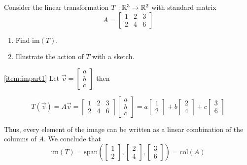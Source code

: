 \documentclass{ximera}
\begin{document}
\begin{example}\label{ex:image1}
Consider the linear transformation $T:\mathbb{R}^3\rightarrow \mathbb{R}^2$ with standard matrix
$$A=\begin{bmatrix}1&2&3\\2&4&6\end{bmatrix}$$

\begin{enumerate}
\item\label{item:impart1}
Find $\mbox{im}(T)$.
\item\label{item:impart2}
Illustrate the action of $T$ with a sketch.

\end{enumerate}
\begin{explanation}

\ref{item:impart1} Let $\vec{v}=\begin{bmatrix}a\\b\\c\end{bmatrix}$ then

$$T(\vec{v})=A\vec{v}=\begin{bmatrix}1&2&3\\2&4&6\end{bmatrix}\begin{bmatrix}a\\b\\c\end{bmatrix}=a\begin{bmatrix}1\\2\end{bmatrix}+b\begin{bmatrix}2\\4\end{bmatrix}+c\begin{bmatrix}3\\6\end{bmatrix}$$

Thus, every element of the image can be written as a linear combination of the columns of $A$.  We conclude that 
$$\mbox{im}(T)=\mbox{span}\left(\begin{bmatrix}1\\2\end{bmatrix}, \begin{bmatrix}2\\4\end{bmatrix}, \begin{bmatrix}3\\6\end{bmatrix}\right)=\mbox{col}(A)$$


\end{explanation}
\end{example}
\end{document}
